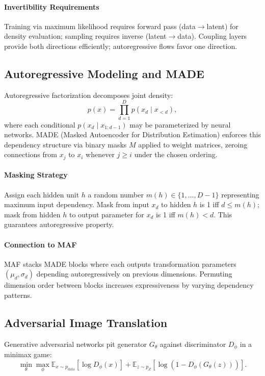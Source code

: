 \documentclass[11pt]{article}
\begin{document}
\paragraph{Invertibility Requirements} Training via maximum likelihood requires forward pass (data$\to$latent) for density evaluation; sampling requires inverse (latent$\to$data). Coupling layers provide both directions efficiently; autoregressive flows favor one direction.

\subsection{Autoregressive Modeling and MADE}
Autoregressive factorization decomposes joint density:
\begin{equation}
p(x) = \prod_{d=1}^{D} p(x_d \mid x_{<d}),
\end{equation}
where each conditional $p(x_d \mid x_{1:d-1})$ may be parameterized by neural networks. MADE (Masked Autoencoder for Distribution Estimation) enforces this dependency structure via binary masks $M$ applied to weight matrices, zeroing connections from $x_j$ to $x_i$ whenever $j \geq i$ under the chosen ordering.

\paragraph{Masking Strategy} Assign each hidden unit $h$ a random number $m(h) \in \{1, \dots, D-1\}$ representing maximum input dependency. Mask from input $x_d$ to hidden $h$ is 1 iff $d \leq m(h)$; mask from hidden $h$ to output parameter for $x_d$ is 1 iff $m(h) < d$. This guarantees autoregressive property.

\paragraph{Connection to MAF} MAF stacks MADE blocks where each outputs transformation parameters $(\mu_d, \sigma_d)$ depending autoregressively on previous dimensions. Permuting dimension order between blocks increases expressiveness by varying dependency patterns.

\subsection{Adversarial Image Translation}
Generative adversarial networks pit generator $G_{\theta}$ against discriminator $D_{\phi}$ in a minimax game:
\begin{equation}
\min_{\theta} \max_{\phi} \mathbb{E}_{x \sim p_{\text{data}}}[\log D_{\phi}(x)] + \mathbb{E}_{z \sim p_Z}[\log(1 - D_{\phi}(G_{\theta}(z)))].
\end{equation}
\end{document}
